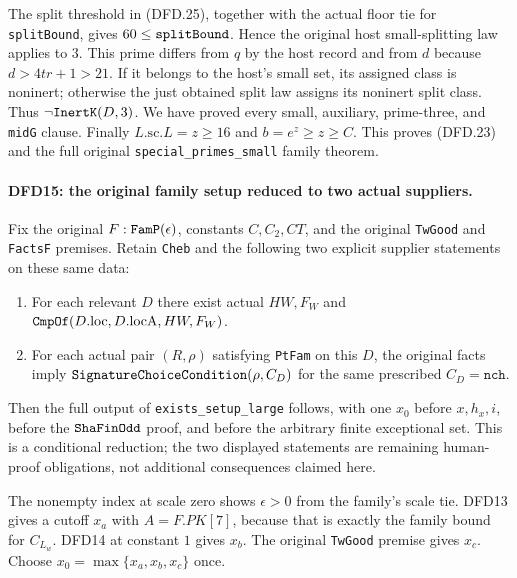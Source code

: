 The split threshold in (DFD.25), together with the actual
floor tie for \texttt{split\allowbreak Bound}, gives
$60\le\texttt{split\allowbreak Bound}$. Hence the original host
small-splitting law applies to $3$. This prime differs
from $q$ by the host record and from $d$ because
$d>4tr+1>21$. If it belongs to the host's small set, its
assigned class is noninert; otherwise the just obtained
split law assigns its noninert split class. Thus
$\neg\texttt{Inert\allowbreak K}(D,3)$. We have proved every small,
auxiliary, prime-three, and \texttt{mid\allowbreak G} clause.
Finally $L.\mathrm{sc}.L=z\ge16$ and
$b=e^z\ge z\ge C$. This proves (DFD.23) and the full
original \texttt{special\_\allowbreak primes\_\allowbreak small} family theorem.

\paragraph{DFD15: the original family setup reduced to two actual suppliers.}
\label{claim:DFD15}
Fix the original $F:\texttt{Fam\allowbreak P}(\epsilon)$, constants
$C,C_2,CT$, and the original \texttt{Tw\allowbreak Good} and
\texttt{Facts\allowbreak F} premises. Retain \texttt{Cheb} and the
following two explicit supplier statements on these same
data:
\begin{enumerate}
\item For each relevant $D$ there exist actual $HW,F_W$
and $\texttt{Cmp\allowbreak Of}(D.\mathrm{loc},D.\mathrm{locA},HW,F_W)$.
\item For each actual pair $(R,\rho)$ satisfying
\texttt{Pt\allowbreak Fam} on this $D$, the original facts imply
$\texttt{Signature\allowbreak Choice\allowbreak Condition}(\rho,C_D)$ for the
same prescribed $C_D=\texttt{nch}$.
\end{enumerate}
Then the full output of \texttt{exists\_\allowbreak setup\_\allowbreak large}
follows, with one $x_0$ before $x,h_x,i$, before the
$\texttt{Sha\allowbreak Fin\allowbreak Odd}$ proof, and before the arbitrary
finite exceptional set. This is a conditional reduction;
the two displayed statements are remaining human-proof
obligations, not additional consequences claimed here.

The nonempty index at scale zero shows $\epsilon>0$
from the family's scale tie. DFD13 gives a cutoff $x_a$
with $A=F.PK[7]$, because that is exactly the family
bound for $C_{L_w}$. DFD14 at constant $1$ gives $x_b$.
The original \texttt{Tw\allowbreak Good} premise gives $x_c$.
Choose $x_0=\max\{x_a,x_b,x_c\}$ once.

